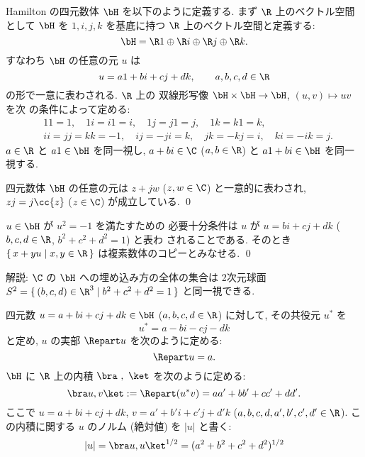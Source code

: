 \documentclass[12pt,twoside]{jarticle}
\begin{document}
Hamilton の四元数体 $\bH$ を以下のように定義する.  まず $\R$ 上のベクトル空間
として $\bH$ を $1,i,j,k$ を基底に持つ $\R$ 上のベクトル空間と定義する:
\begin{equation*}
  \bH = \R 1 \oplus \R i \oplus \R j \oplus \R k.
\end{equation*}
すなわち $\bH$ の任意の元 $u$ は 
\begin{equation*}
  u = a 1 + b i + c j + d k, \qquad a,b,c,d\in\R
\end{equation*}
の形で一意に表わされる.  $\R$ 上の
双線形写像 $\bH\times\bH\to\bH$, $(u,v)\mapsto uv$ を次
の条件によって定める:
\begin{align*}
  &
  11=1, \quad
  1i=i1=i, \quad
  1j=j1=j, \quad
  1k=k1=k, \quad
  \\ &
  ii=jj=kk=-1, \quad
  ij=-ji=k, \quad
  jk=-kj=i, \quad
  ki=-ik=j.
\end{align*}
$a\in\R$ と $a1\in\bH$ を同一視し,
$a+bi\in\C$ ($a,b\in\R$) と $a1+bi\in\bH$ を同一視する.


\begin{question}
  四元数体 $\bH$ の任意の元は $z+jw$ ($z,w\in\C$) と一意的に表わされ,
  $zj=j\cc{z}$ ($z\in\C$) が成立している.  \qed
\end{question}


\begin{question}
  $u\in\bH$ が $u^2=-1$ を満たすための
  必要十分条件は $u$ が $u=bi+cj+dk$ ($b,c,d\in\R$, $b^2+c^2+d^2=1$) と表わ
  されることである. 
  そのとき $\{\,x+yu\mid x,y\in\R\,\}$ は複素数体のコピーとみなせる.
  \qed
\end{question}

\noindent
解説: $\C$ の $\bH$ への埋め込み方の全体の集合は
2次元球面 $S^2=\{\,(b,c,d)\in\R^3\mid b^2+c^2+d^2=1\,\}$ と同一視できる.

\medskip

四元数 $u = a + bi + cj + dk\in\bH$ ($a,b,c,d\in\R$) に対して,
その共役元 $u^*$ を
\begin{equation*}
  u^* = a - bi - cj - dk
\end{equation*}
と定め, $u$ の実部 $\Repart u$ を次のように定める:
\begin{equation*}
  \Repart u = a.
\end{equation*}
$\bH$ に $\R$ 上の内積 $\bra\ ,\ \ket$ を次のように定める:
\begin{equation*}
  \bra u,v\ket := \Repart(u^*v) = aa' + bb' + cc' + dd'.
\end{equation*}
ここで $u=a+bi+cj+dk$, $v=a'+b'i+c'j+d'k$ ($a,b,c,d,a',b',c',d'\in\R$).
この内積に関する $u$ のノルム (絶対値) を $|u|$ と書く:
\begin{equation*}
  |u| = \bra u,u\ket^{1/2} = (a^2 + b^2 + c^2 + d^2)^{1/2}
\end{equation*}
\end{document}
